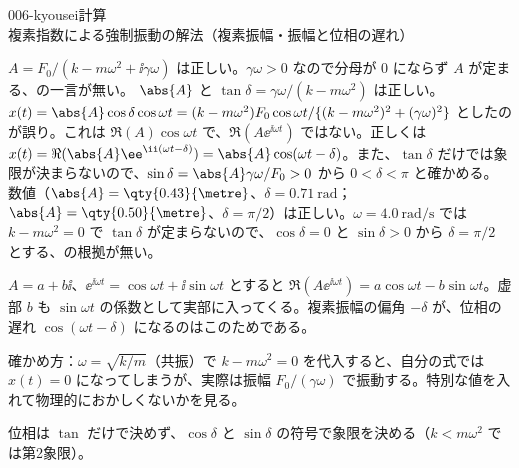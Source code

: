 \documentclass[uplatex,dvipdfmx,a4paper,11pt]{jsarticle}
\begin{document}
\begin{mondai}{006-kyousei}{計算}{複素指数による強制振動の解法（複素振幅・振幅と位相の遅れ）}
\begin{kotaeran}
   $A=F_{0}/(k-m\omega^{2}+\ii\gamma\omega)$ は正しい。$\gamma\omega>0$ なので分母が $0$ にならず $A$ が定まる、の一言が無い。
   $\abs{A}$ と $\tan\delta=\gamma\omega/(k-m\omega^{2})$ は正しい。$x(t)=\abs{A}\cos\delta\cos\omega t=(k-m\omega^{2})F_{0}\cos\omega t/\{(k-m\omega^{2})^{2}+(\gamma\omega)^{2}\}$ としたのが誤り。これは $\Re(A)\cos\omega t$ で、$\Re(A\ee^{\ii\omega t})$ ではない。正しくは $x(t)=\Re(\abs{A}\ee^{\ii(\omega t-\delta)})=\abs{A}\cos(\omega t-\delta)$。また、$\tan\delta$ だけでは象限が決まらないので、$\sin\delta=\abs{A}\gamma\omega/F_{0}>0$ から $0<\delta<\pi$ と確かめる。
   数値（$\abs{A}=\qty{0.43}{\metre}$、$\delta=\qty{0.71}{\radian}$；$\abs{A}=\qty{0.50}{\metre}$、$\delta=\pi/2$）は正しい。$\omega=\qty{4.0}{\radian\per\second}$ では $k-m\omega^{2}=0$ で $\tan\delta$ が定まらないので、$\cos\delta=0$ と $\sin\delta>0$ から $\delta=\pi/2$ とする、の根拠が無い。
\end{kotaeran}
\begin{rikai}
  \item $A=a+b\ii$、$\ee^{\ii\omega t}=\cos\omega t+\ii\sin\omega t$ とすると $\Re(A\ee^{\ii\omega t})=a\cos\omega t-b\sin\omega t$。虚部 $b$ も $\sin\omega t$ の係数として実部に入ってくる。複素振幅の偏角 $-\delta$ が、位相の遅れ $\cos(\omega t-\delta)$ になるのはこのためである。
  \item 確かめ方：$\omega=\sqrt{k/m}$（共振）で $k-m\omega^{2}=0$ を代入すると、自分の式では $x(t)=0$ になってしまうが、実際は振幅 $F_{0}/(\gamma\omega)$ で振動する。特別な値を入れて物理的におかしくないかを見る。
  \item 位相は $\tan$ だけで決めず、$\cos\delta$ と $\sin\delta$ の符号で象限を決める（$k<m\omega^{2}$ では第2象限）。
\end{rikai}
\end{mondai}
\end{document}
